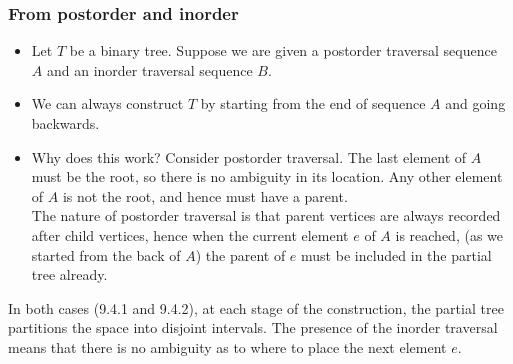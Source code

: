 \documentclass{article}
\begin{document}
\subsubsection{From postorder and inorder}
\begin{itemize}
	\item Let $T$ be a binary tree. Suppose we are given a postorder traversal sequence $A$ and an inorder traversal sequence $B$.
	\item We can always construct $T$ by starting from the end of sequence $A$ and going backwards.
	\item Why does this work? Consider postorder traversal. The last element of $A$ must be the root, so there is no ambiguity in its location. Any other element of $A$ is not the root, and hence must have a parent.\\
	The nature of postorder traversal is that parent vertices are always recorded after child vertices, hence when the current element $e$ of $A$ is reached, (as we started from the back of $A$) the parent of $e$ must be included in the partial tree already.
\end{itemize}
In both cases (9.4.1 and 9.4.2), at each stage of the construction, the partial tree partitions the space into disjoint intervals. The presence of the inorder traversal means that there is no ambiguity as to where to place the next element $e$.
\end{document}
